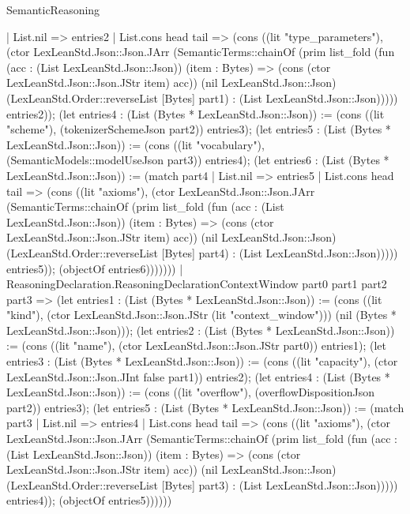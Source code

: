 \begin{lexlean}{SemanticReasoning}
\begin{semanticmodule}
{      | List.nil => entries2
      | List.cons head tail => (cons ((lit "type_parameters"), (ctor LexLeanStd.Json::Json.JArr (SemanticTerms::chainOf (prim list_fold (fun (acc : (List LexLeanStd.Json::Json)) (item : Bytes) => (cons (ctor LexLeanStd.Json::Json.JStr item) acc)) (nil LexLeanStd.Json::Json) (LexLeanStd.Order::reverseList [Bytes] part1) : (List LexLeanStd.Json::Json))))) entries2)); (let entries4 : (List (Bytes * LexLeanStd.Json::Json)) := (cons ((lit "scheme"), (tokenizerSchemeJson part2)) entries3); (let entries5 : (List (Bytes * LexLeanStd.Json::Json)) := (cons ((lit "vocabulary"), (SemanticModels::modelUseJson part3)) entries4); (let entries6 : (List (Bytes * LexLeanStd.Json::Json)) := (match part4
      | List.nil => entries5
      | List.cons head tail => (cons ((lit "axioms"), (ctor LexLeanStd.Json::Json.JArr (SemanticTerms::chainOf (prim list_fold (fun (acc : (List LexLeanStd.Json::Json)) (item : Bytes) => (cons (ctor LexLeanStd.Json::Json.JStr item) acc)) (nil LexLeanStd.Json::Json) (LexLeanStd.Order::reverseList [Bytes] part4) : (List LexLeanStd.Json::Json))))) entries5)); (objectOf entries6)))))))
    | ReasoningDeclaration.ReasoningDeclarationContextWindow part0 part1 part2 part3 => (let entries1 : (List (Bytes * LexLeanStd.Json::Json)) := (cons ((lit "kind"), (ctor LexLeanStd.Json::Json.JStr (lit "context_window"))) (nil (Bytes * LexLeanStd.Json::Json))); (let entries2 : (List (Bytes * LexLeanStd.Json::Json)) := (cons ((lit "name"), (ctor LexLeanStd.Json::Json.JStr part0)) entries1); (let entries3 : (List (Bytes * LexLeanStd.Json::Json)) := (cons ((lit "capacity"), (ctor LexLeanStd.Json::Json.JInt false part1)) entries2); (let entries4 : (List (Bytes * LexLeanStd.Json::Json)) := (cons ((lit "overflow"), (overflowDispositionJson part2)) entries3); (let entries5 : (List (Bytes * LexLeanStd.Json::Json)) := (match part3
      | List.nil => entries4
      | List.cons head tail => (cons ((lit "axioms"), (ctor LexLeanStd.Json::Json.JArr (SemanticTerms::chainOf (prim list_fold (fun (acc : (List LexLeanStd.Json::Json)) (item : Bytes) => (cons (ctor LexLeanStd.Json::Json.JStr item) acc)) (nil LexLeanStd.Json::Json) (LexLeanStd.Order::reverseList [Bytes] part3) : (List LexLeanStd.Json::Json))))) entries4)); (objectOf entries5))))))
}
\end{semanticmodule}
\end{lexlean}
